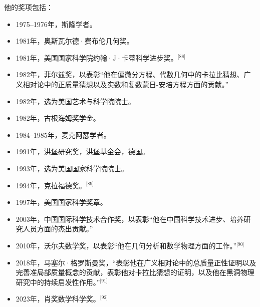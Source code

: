 他的奖项包括：
\begin{itemize}
\item 1975–1976年，斯隆学者。
\item 1981年，奥斯瓦尔德·费布伦几何奖。
\item 1981年，美国国家科学院约翰·J·卡蒂科学进步奖。\(^\text{[88]}\)
\item 1982年，菲尔兹奖，以表彰“他在偏微分方程、代数几何中的卡拉比猜想、广义相对论中的正质量猜想以及实数和复数蒙日-安培方程方面的贡献。”
\item 1982年，选为美国艺术与科学院院士。
\item 1982年，古根海姆奖学金。
\item 1984–1985年，麦克阿瑟学者。
\item 1991年，洪堡研究奖，洪堡基金会，德国。
\item 1993年，选为美国国家科学院院士。
\item 1994年，克拉福德奖。\(^\text{[89]}\)
\item 1997年，美国国家科学奖章。
\item 2003年，中国国际科学技术合作奖，以表彰“他在中国科学技术进步、培养研究人员方面的杰出贡献。”
\item 2010年，沃尔夫数学奖，以表彰“他在几何分析和数学物理方面的工作。”\(^\text{[90]}\)
\item 2018年，马塞尔·格罗斯曼奖，“表彰他在广义相对论中的总质量正性证明以及完善准局部质量概念的贡献，表彰他对卡拉比猜想的证明，以及他在黑洞物理研究中的持续启发性作用。”\(^\text{[91]}\)
\item 2023年，肖奖数学科学奖。\(^\text{[92]}\)
\end{itemize}
